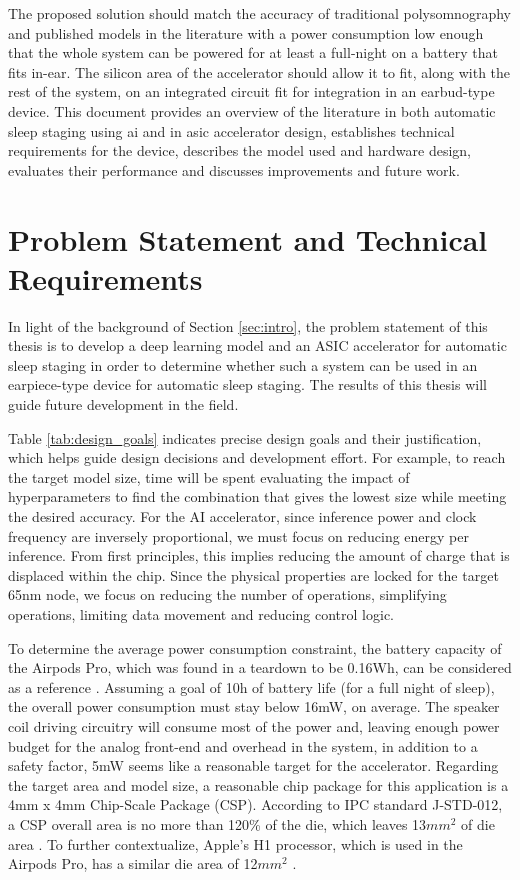 \documentclass[12pt]{article}
\begin{document}
The proposed solution should match the accuracy of traditional polysomnography and published models in the literature with a power consumption low enough that the whole system
can be powered for at least a full-night on a battery that fits in-ear. The silicon area of the accelerator should allow it to fit, along with the rest of the system, on an integrated
circuit fit for integration in an earbud-type device. This document provides an overview of the literature in both automatic sleep staging using \ac{ai} and in \ac{asic} accelerator
design, establishes technical requirements for the device, describes the model used and hardware design, evaluates their performance and discusses improvements and future work.
\newpage

\section{Problem Statement and Technical Requirements}
\label{sec:prob_statement}
In light of the background of Section \ref{sec:intro}, the problem statement of this thesis is to develop a deep learning model and an ASIC accelerator for automatic sleep staging
in order to determine whether such a system can be used in an earpiece-type device for automatic sleep staging. The results of this thesis will guide future development in the field.

Table \ref{tab:design_goals} indicates precise design goals and their justification, which helps guide design decisions and development effort. For example, to reach the target
model size, time will be spent evaluating the impact of hyperparameters to find the combination that gives the lowest size while meeting the desired accuracy. For the AI accelerator,
since inference power and clock frequency are inversely proportional, we must focus on reducing energy per inference. From first principles, this implies reducing the amount of
charge that is displaced within the chip. Since the physical properties are locked for the target 65nm node, we focus on reducing the number of operations, simplifying operations,
limiting data movement and reducing control logic.

To determine the average power consumption constraint, the battery capacity of the Airpods Pro, which was found in a teardown to be 0.16Wh, can be considered as a reference
\cite*{AirpodsIfixitTeardown}. Assuming a goal of 10h of battery life (for a full night of sleep), the overall power consumption must stay below 16mW, on average. The speaker coil
driving circuitry will consume most of the power and, leaving enough power budget for the analog front-end and overhead in the system, in addition to a safety factor, 5mW seems
like a reasonable target for the accelerator. Regarding the target area and model size, a reasonable chip package for this application is a 4mm x 4mm Chip-Scale Package (CSP).
According to IPC standard J-STD-012, a CSP overall area is no more than 120\% of the die, which leaves 13$mm^2$ of die area \cite*{J_STD_012}. To further contextualize, Apple's
H1 processor, which is used in the Airpods Pro, has a similar die area of 12$mm^2$ \cite*{H1DieSize}.
\end{document}
